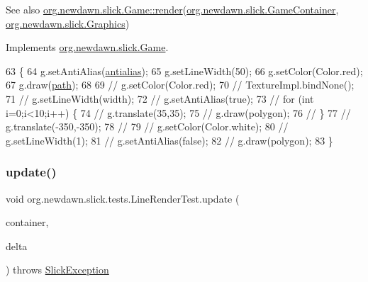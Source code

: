 \begin{DoxySeeAlso}{See also}
\mbox{\hyperlink{interfaceorg_1_1newdawn_1_1slick_1_1_game_af1a4670d43eb3ba04dfcf55ab1975b64}{org.\+newdawn.\+slick.\+Game\+::render}}(\mbox{\hyperlink{classorg_1_1newdawn_1_1slick_1_1_game_container}{org.\+newdawn.\+slick.\+Game\+Container}}, \mbox{\hyperlink{classorg_1_1newdawn_1_1slick_1_1_graphics}{org.\+newdawn.\+slick.\+Graphics}}) 
\end{DoxySeeAlso}


Implements \mbox{\hyperlink{interfaceorg_1_1newdawn_1_1slick_1_1_game_af1a4670d43eb3ba04dfcf55ab1975b64}{org.\+newdawn.\+slick.\+Game}}.


\begin{DoxyCode}
63                                                                                   \{
64         g.setAntiAlias(\mbox{\hyperlink{classorg_1_1newdawn_1_1slick_1_1tests_1_1_line_render_test_acf6b3869ee9b841334e44f56f15dfef0}{antialias}});
65         g.setLineWidth(50);
66         g.setColor(Color.red);
67         g.draw(\mbox{\hyperlink{classorg_1_1newdawn_1_1slick_1_1tests_1_1_line_render_test_a1585e6e77bca69047a515e8f2cd9d650}{path}});
68         
69 \textcolor{comment}{//      g.setColor(Color.red);}
70 \textcolor{comment}{//      TextureImpl.bindNone();}
71 \textcolor{comment}{//      g.setLineWidth(width);}
72 \textcolor{comment}{//      g.setAntiAlias(true);}
73 \textcolor{comment}{//      for (int i=0;i<10;i++) \{}
74 \textcolor{comment}{//          g.translate(35,35);}
75 \textcolor{comment}{//          g.draw(polygon);}
76 \textcolor{comment}{//      \}}
77 \textcolor{comment}{//      g.translate(-350,-350);}
78 \textcolor{comment}{//      }
79 \textcolor{comment}{//      g.setColor(Color.white);}
80 \textcolor{comment}{//      g.setLineWidth(1);}
81 \textcolor{comment}{//      g.setAntiAlias(false);}
82 \textcolor{comment}{//      g.draw(polygon);}
83     \}
\end{DoxyCode}
\mbox{\label{classorg_1_1newdawn_1_1slick_1_1tests_1_1_line_render_test_afcec9cc5b92bd4c527f7efb52ddd9697}} 
\subsubsection{\texorpdfstring{update()}{update()}}
{\footnotesize\ttfamily void org.\+newdawn.\+slick.\+tests.\+Line\+Render\+Test.\+update (\begin{DoxyParamCaption}\item[{\mbox{\hyperlink{classorg_1_1newdawn_1_1slick_1_1_game_container}{Game\+Container}}}]{container,  }\item[{int}]{delta }\end{DoxyParamCaption}) throws \mbox{\hyperlink{classorg_1_1newdawn_1_1slick_1_1_slick_exception}{Slick\+Exception}}\hspace{0.3cm}{\ttfamily [inline]}}

